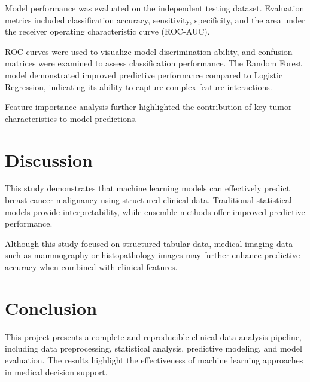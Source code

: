 \documentclass[12pt]{article}
\begin{document}
Model performance was evaluated on the independent testing dataset. Evaluation metrics
included classification accuracy, sensitivity, specificity, and the area under the
receiver operating characteristic curve (ROC-AUC).

ROC curves were used to visualize model discrimination ability, and confusion matrices
were examined to assess classification performance. The Random Forest model demonstrated
improved predictive performance compared to Logistic Regression, indicating its ability
to capture complex feature interactions.

Feature importance analysis further highlighted the contribution of key tumor
characteristics to model predictions.

\section{Discussion}

This study demonstrates that machine learning models can effectively predict breast
cancer malignancy using structured clinical data. Traditional statistical models provide
interpretability, while ensemble methods offer improved predictive performance.

Although this study focused on structured tabular data, medical imaging data such as
mammography or histopathology images may further enhance predictive accuracy when combined
with clinical features.

\section{Conclusion}

This project presents a complete and reproducible clinical data analysis pipeline,
including data preprocessing, statistical analysis, predictive modeling, and model
evaluation. The results highlight the effectiveness of machine learning approaches
in medical decision support.
\end{document}
